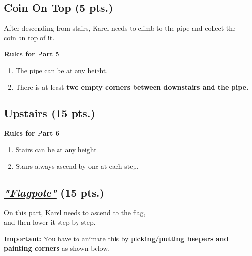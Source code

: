 \documentclass[a4paper]{article}
\begin{document}
\subsection{Coin On Top (5 pts.)}

After descending from stairs, Karel needs to climb to the pipe and collect the coin on top of it.



\textbf{Rules for Part 5}
\begin{enumerate}
\item The pipe can be at any height.
\item There is at least \textbf{two empty corners between downstairs and the pipe.}
\end{enumerate}

\subsection{Upstairs (15 pts.)}


\textbf{Rules for Part 6}
\begin{enumerate}
\item Stairs can be at any height.
\item Stairs always ascend by one at each step.
\end{enumerate}

\newpage

\subsection{\emph{\href{https://www.mariowiki.com/Goal_Pole}{"Flagpole"}} (15 pts.)}
On this part, Karel needs to ascend to the flag,\\
 and then lower it step by step.

\textbf{Important:} You have to animate this by \textbf{picking/putting beepers and painting corners} as shown below.
\end{document}
